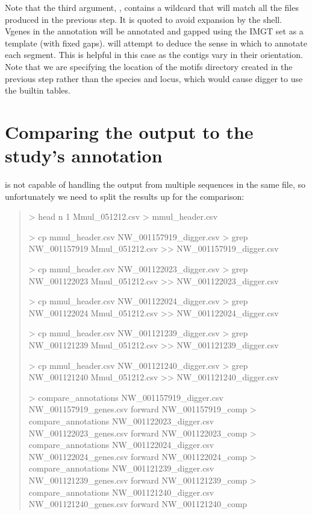 \documentclass[letterpaper,10pt,english]{sphinxmanual}
\begin{document}
\sphinxAtStartPar
Note that the third argument, , contains a wildcard that will match all the files produced in the previous step. It is quoted to avoid expansion by the shell.
V\sphinxhyphen{}genes in the annotation will be annotated and gapped using the IMGT set as a template (with fixed gaps).
 will attempt to deduce the sense in which to annotate each segment. This is helpful in this case as the contigs vary in their orientation.  Note that we are
specifying the location of the motifs directory created in the previous step rather than the species and locus, which would cause digger to use the built\sphinxhyphen{}in tables.


\section{Comparing the output to the study’s annotation}
\label{\detokenize{examples/rhesus_igh:comparing-the-output-to-the-study-s-annotation}}
\sphinxAtStartPar
{} is not capable of handling the output from multiple sequences in the same file, so unfortunately we need to split the results up for the comparison:
\begin{quote}

\sphinxAtStartPar
\textgreater{} head \sphinxhyphen{}n 1 Mmul\_051212.csv \textgreater{} mmul\_header.csv

\sphinxAtStartPar
\textgreater{} cp mmul\_header.csv NW\_001157919\_digger.csv
\textgreater{} grep NW\_001157919 Mmul\_051212.csv \textgreater{}\textgreater{} NW\_001157919\_digger.csv

\sphinxAtStartPar
\textgreater{} cp mmul\_header.csv NW\_001122023\_digger.csv
\textgreater{} grep NW\_001122023 Mmul\_051212.csv \textgreater{}\textgreater{} NW\_001122023\_digger.csv

\sphinxAtStartPar
\textgreater{} cp mmul\_header.csv NW\_001122024\_digger.csv
\textgreater{} grep NW\_001122024 Mmul\_051212.csv \textgreater{}\textgreater{} NW\_001122024\_digger.csv

\sphinxAtStartPar
\textgreater{} cp mmul\_header.csv NW\_001121239\_digger.csv
\textgreater{} grep NW\_001121239 Mmul\_051212.csv \textgreater{}\textgreater{} NW\_001121239\_digger.csv

\sphinxAtStartPar
\textgreater{} cp mmul\_header.csv NW\_001121240\_digger.csv
\textgreater{} grep NW\_001121240 Mmul\_051212.csv \textgreater{}\textgreater{} NW\_001121240\_digger.csv

\sphinxAtStartPar
\textgreater{} compare\_annotations NW\_001157919\_digger.csv NW\_001157919\_genes.csv forward NW\_001157919\_comp
\textgreater{} compare\_annotations NW\_001122023\_digger.csv NW\_001122023\_genes.csv forward NW\_001122023\_comp
\textgreater{} compare\_annotations NW\_001122024\_digger.csv NW\_001122024\_genes.csv forward NW\_001122024\_comp
\textgreater{} compare\_annotations NW\_001121239\_digger.csv NW\_001121239\_genes.csv forward NW\_001121239\_comp
\textgreater{} compare\_annotations NW\_001121240\_digger.csv NW\_001121240\_genes.csv forward NW\_001121240\_comp
\end{quote}
\end{document}
